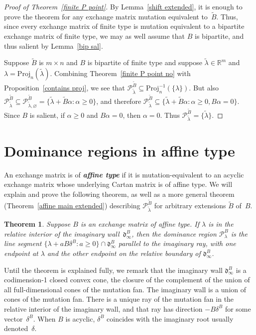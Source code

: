 \documentclass[10pt]{article}
\newtheorem{theorem}[proposition]{Theorem}
\theoremstyle{definition}
\theoremstyle{remark}
\numberwithin{equation}{section}
\newcommand{\newword}[1]{\textbf{\emph{#1}}}
\newcommand{\reals}{\mathbb R}
\newcommand{\set}[1]{{\lbrace #1 \rbrace}}
\newcommand{\0}{{\mathbf{0}}}
\newcommand{\Cone}{\mathrm{Cone}}
\newcommand{\Proj}{\mathrm{Proj}}
\newcommand{\tB}{{\widetilde{B}}}
\renewcommand{\P}{\mathcal{P}}
\renewcommand{\d}{{\mathfrak d}}
\begin{document}
\begin{proof}[Proof of Theorem~\ref{finite P point}]
By Lemma~\ref{shift extended}, it is enough to prove the theorem for any exchange matrix mutation equivalent to~$\tB$.
Thus, since every exchange matrix of finite type is mutation equivalent to a bipartite exchange matrix of finite type, we may as well assume that $B$ is bipartite, and thus salient by Lemma~\ref{bip sal}.

Suppose $\tB$ is $m\times n$ and $B$ is bipartite of finite type and suppose $\tilde\lambda\in\reals^m$ and $\lambda=\Proj_n(\tilde\lambda)$.
Combining Theorem~\ref{finite P point no} with Proposition~\ref{contains proj}, we see that $\P_{\tilde\lambda}^\tB\subseteq\Proj_n^{-1}(\set{\lambda})$.
But also $\P_{\tilde\lambda}^\tB\subseteq\P_{\tilde\lambda,\varnothing}^\tB=\set{\tilde\lambda+\tB\alpha:\alpha\ge0}$, and therefore ${\P_{\tilde\lambda}^\tB\subseteq\set{\tilde\lambda+\tB\alpha:\alpha\ge0,B\alpha=0}}$.
Since $B$ is salient, if $\alpha\ge0$ and $B\alpha=0$, then $\alpha=0$.
Thus $\P_{\tilde\lambda}^\tB=\set{\tilde\lambda}$.
\end{proof}



\section{Dominance regions in affine type}\label{aff sec}
An exchange matrix is of \newword{affine type} if it is mutation-equivalent to an acyclic exchange matrix whose underlying Cartan matrix is of affine type.
We will explain and prove the following theorem, as well as a more general theorem (Theorem~\ref{affine main extended}) describing $\P^\tB_{\tilde\lambda}$ for arbitrary extensions $\tB$ of~$B$.

\begin{theorem}\label{affine main} 
Suppose $B$ is an exchange matrix of affine type.
If $\lambda$ is in the relative interior of the imaginary wall~$\d^B_\infty$, then the dominance region $\P^B_\lambda$ is the line segment ${\set{\lambda+aB\delta^B:a\ge0}\cap\d^B_\infty}$ parallel to the imaginary ray, with one endpoint at $\lambda$ and the other endpoint on the relative boundary of $\d^B_\infty$.
\end{theorem}

Until the theorem is explained fully, we remark that the imaginary wall $\d^B_\infty$ is a codimension-1 closed convex cone, the closure of the complement of the union of all full-dimensional cones of the mutation fan.
The imaginary wall is a union of cones of the mutation fan.
There is a unique ray of the mutation fan in the relative interior of the imaginary wall, and that ray has direction $-B\delta^B$ for some vector~$\delta^B$.
When $B$ is acyclic, $\delta^B$ coincides with the imaginary root usually denoted~$\delta$.
\end{document}
